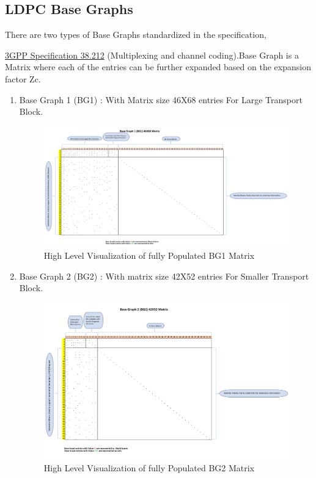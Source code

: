 \documentclass[journal,twocolumn]{IEEEtran}
\begin{document}
{ \subsection{\textbf{LDPC Base Graphs}}   
    There are two types of Base Graphs standardized in the specification, {\href{https://www.etsi.org/deliver/etsi_ts/138200_138299/138212/17.01.00_60/ts_138212v170100p.pdf}{3GPP Specification 38.212} (Multiplexing and channel coding).Base Graph is a Matrix where each of the entries can be further expanded based on the expansion factor Zc.
\begin{enumerate}
  \item  Base Graph 1 (BG1) : With Matrix size 46X68 entries For Large Transport Block. \\
   \begin{figure}[h]
  \includegraphics[width=\columnwidth]{../figs/bg1.png} 
  \caption{High Level Visualization of fully Populated BG1 Matrix}
  \end{figure}
  \item  Base Graph 2 (BG2) : With matrix size 42X52 entries For Smaller Transport Block.\\
  \begin{figure}[h]
  \includegraphics[width=\columnwidth]{../figs/bg2.png} 
  \caption{High Level Visualization of fully Populated BG2 Matrix}
  \end{figure}
      \end{enumerate}
      
}}
\end{document}
